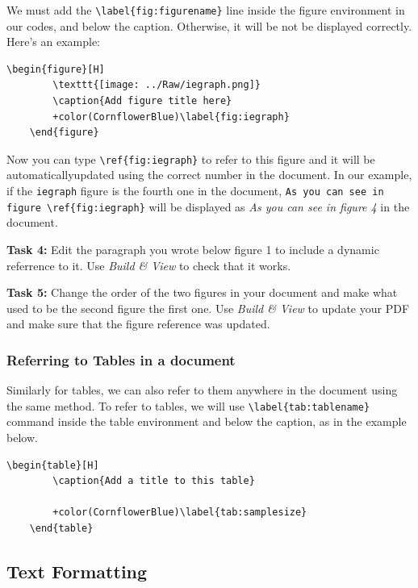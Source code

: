 \documentclass[12pts]{article}
\begin{document}
	We must add the \verb|\label{fig:figurename}| line inside the figure environment in our codes, and below the caption. Otherwise, it will be not be displayed correctly. Here's an example:
	
	\begin{Verbatim}[commandchars=+\(\)]
	\begin{figure}[H]
		\texttt{[image: ../Raw/iegraph.png]}
		\caption{Add figure title here}
		+color(CornflowerBlue)\label{fig:iegraph}
	\end{figure}
	\end{Verbatim}
	
	Now you can type \verb|\ref{fig:iegraph}| to refer to this figure and it will be automaticallyupdated using the correct number in the document. In our example, if the \texttt{iegraph} figure is the fourth one in the document, \verb|As you can see in figure \ref{fig:iegraph}| will be displayed as \emph{As you can see in figure 4} in the document. 
	
	\textcolor{BurntOrange}{\textbf{Task 4:}} Edit the paragraph you wrote below figure 1 to include a dynamic referrence to it. Use \emph{Build \& View} to check that it works.
	
	\textcolor{BurntOrange}{\textbf{Task 5:}} Change the order of the two figures in your document and make what used to be the second figure the first one. Use \emph{Build \& View} to update your PDF and make sure that the figure reference was updated.
	
	\subsubsection{Referring to Tables in a document}
	
	Similarly for tables, we can also refer to them anywhere in the document using the same method. To refer to tables, we will use \verb|\label{tab:tablename}| command inside the table environment and below the caption, as in the example below. 
	
	\begin{Verbatim}[commandchars=+\(\)]
	\begin{table}[H]
		\caption{Add a title to this table}
		
		+color(CornflowerBlue)\label{tab:samplesize}
	\end{table}
	\end{Verbatim}
	
	\subsection{Text Formatting}
	
\end{document}
